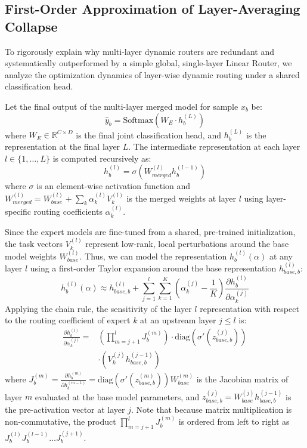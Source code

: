 \subsection{First-Order Approximation of Layer-Averaging Collapse}
To rigorously explain why multi-layer dynamic routers are redundant and systematically outperformed by a simple global, single-layer Linear Router, we analyze the optimization dynamics of layer-wise dynamic routing under a shared classification head.

Let the final output of the multi-layer merged model for sample $x_b$ be:
\begin{equation}
\hat{y}_b = \text{Softmax}\left( W_E \cdot h_b^{(L)} \right)
\label{eq:output}
\end{equation}
where $W_E \in \mathbb{R}^{C \times D}$ is the final joint classification head, and $h_b^{(L)}$ is the representation at the final layer $L$. The intermediate representation at each layer $l \in \{1, \dots, L\}$ is computed recursively as:
\begin{equation}
h_b^{(l)} = \sigma\left( W_{merged}^{(l)} h_b^{(l-1)} \right)
\label{eq:rec_rep}
\end{equation}
where $\sigma$ is an element-wise activation function and $W_{merged}^{(l)} = W_{base}^{(l)} + \sum_k \alpha_k^{(l)} V_k^{(l)}$ is the merged weights at layer $l$ using layer-specific routing coefficients $\alpha_k^{(l)}$.

Since the expert models are fine-tuned from a shared, pre-trained initialization, the task vectors $V_k^{(l)}$ represent low-rank, local perturbations around the base model weights $W_{base}^{(l)}$. Thus, we can model the representation $h_b^{(l)}(\alpha)$ at any layer $l$ using a first-order Taylor expansion around the base representation $h_{base, b}^{(l)}$:
\begin{equation}
h_b^{(l)}(\alpha) \approx h_{base, b}^{(l)} + \sum_{j=1}^l \sum_{k=1}^K \left( \alpha_k^{(j)} - \frac{1}{K} \right) \frac{\partial h_b^{(l)}}{\partial \alpha_k^{(j)}}
\label{eq:taylor_expansion}
\end{equation}
Applying the chain rule, the sensitivity of the layer $l$ representation with respect to the routing coefficient of expert $k$ at an upstream layer $j \le l$ is:
\begin{equation}
\begin{split}
\frac{\partial h_b^{(l)}}{\partial \alpha_k^{(j)}} = &\left( \prod_{m=j+1}^l J_b^{(m)} \right) \cdot \text{diag}\left(\sigma'\left(z_{base, b}^{(j)}\right)\right) \\
&\cdot \left( V_k^{(j)} h_{base, b}^{(j-1)} \right)
\end{split}
\label{eq:sensitivity}
\end{equation}
where $J_b^{(m)} = \frac{\partial h_b^{(m)}}{\partial h_b^{(m-1)}} = \text{diag}(\sigma'(z_{base, b}^{(m)})) W_{base}^{(m)}$ is the Jacobian matrix of layer $m$ evaluated at the base model parameters, and $z_{base, b}^{(j)} = W_{base}^{(j)} h_{base, b}^{(j-1)}$ is the pre-activation vector at layer $j$. Note that because matrix multiplication is non-commutative, the product $\prod_{m=j+1}^l J_b^{(m)}$ is ordered from left to right as $J_b^{(l)} J_b^{(l-1)} \dots J_b^{(j+1)}$.

